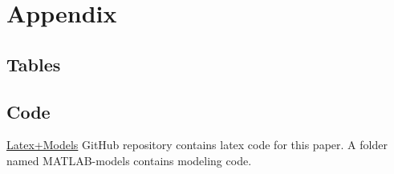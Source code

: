 \appendix

\section{Appendix}\label{sec:appendix}

\subsection{Tables}





























\subsection{Code}
\href{https://github.com/opj-johns/ci-thesis-dam-sltn-expn-mcdm}{Latex+Models}
GitHub repository contains latex code for this paper. A folder named MATLAB-models contains modeling code.




